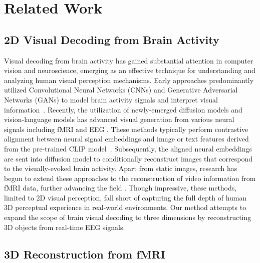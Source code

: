\section{Related Work}
\label{sec:related_work}

\subsection{2D Visual Decoding from Brain Activity}


Visual decoding from brain activity \cite{lahner2024modeling,yi2024learning,chen2023seeing,chen2024eegformer,chen2024cinematic,zhang2022neural} has gained substantial attention in computer vision and neuroscience, emerging as an effective technique for understanding and analyzing human visual perception mechanisms.
Early approaches predominantly utilized Convolutional Neural Networks (CNNs) and Generative Adversarial Networks (GANs) to model brain activity signals and interpret visual information~\cite{horikawa2017generic,shen2019deep,beliy2019voxels,lin2022mind,ozcelik2022reconstruction,huang2021fmri}. 
Recently, the utilization of newly-emerged diffusion models \cite{ho2020denoising,nichol2021improved} and vision-language models \cite{li2023blip,zhu2023minigpt} has advanced visual generation from various neural signals including fMRI \cite{chen2023seeing,takagi2023high,scotti2024reconstructing,sun2024contrast,scotti2024mindeye2}
and EEG \cite{song2023decoding,bai2023dreamdiffusion,li2024visual,singh2023eeg2image}. 
These methods typically perform contrastive alignment \cite{wang2020understanding} between 
neural signal embeddings and image or text features derived from the pre-trained CLIP model~\cite{radford2021learning}. Subsequently, the aligned neural embeddings are sent into diffusion model to conditionally reconstruct images that correspond to the visually-evoked brain activity. 
Apart from static images,
research has begun to extend these approaches to the reconstruction of video information from fMRI data, further advancing the field \cite{chen2024cinematic,sun2024neurocine,wen2018neural,wang2022reconstructing,kupershmidt2022penny}.
Though impressive, these methods, limited to 2D visual perception, fall short of capturing the full depth of human 3D perceptual experience in real-world environments. Our method attempts to expand the scope of brain visual decoding to three dimensions by reconstructing 3D objects from real-time EEG signals.

\subsection{3D Reconstruction from fMRI}

